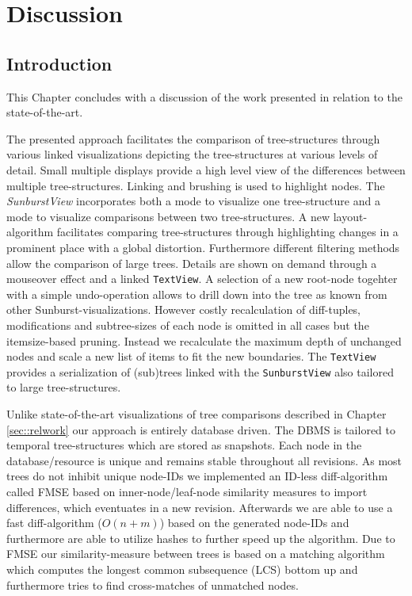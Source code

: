 \section{Discussion}\label{sec::discussion}
\subsection{Introduction}
This Chapter concludes with a discussion of the work presented in relation to the state-of-the-art.

The presented approach facilitates the comparison of tree-structures through various linked visualizations depicting the tree-structures at various levels of detail. Small multiple displays provide a high level view of the differences between multiple tree-structures. Linking and brushing is used to highlight nodes. The \emph{SunburstView} incorporates both a mode to visualize one tree-structure and a mode to visualize comparisons between two tree-structures. A new layout-algorithm facilitates comparing tree-structures through highlighting changes in a prominent place with a global distortion. Furthermore different filtering methods allow the comparison of large trees. Details are shown on demand through a mouseover effect and a linked \texttt{TextView}. A selection of a new root-node togehter with a simple undo-operation allows to drill down into the tree as known from other Sunburst-visualizations. However costly recalculation of diff-tuples, modifications and subtree-sizes of each node is omitted in all cases but the itemsize-based pruning. Instead we recalculate the maximum depth of unchanged nodes and scale a new list of items to fit the new boundaries. The \texttt{TextView} provides a serialization of (sub)trees linked with the \texttt{SunburstView} also tailored to large tree-structures.

Unlike state-of-the-art visualizations of tree comparisons described in Chapter \ref{sec::relwork} our approach is entirely database driven. The DBMS is tailored to temporal tree-structures which are stored as snapshots. Each node in the database/resource is unique and remains stable throughout all revisions. As most trees do not inhibit unique node-IDs we implemented an ID-less diff-algorithm called FMSE based on inner-node/leaf-node similarity measures to import differences, which eventuates in a new revision. Afterwards we are able to use a fast diff-algorithm ($O(n+m)$) based on the generated node-IDs and furthermore are able to utilize hashes to further speed up the algorithm. Due to FMSE our similarity-measure between trees is based on a matching algorithm which computes the longest common subsequence (LCS) bottom up and furthermore tries to find cross-matches of unmatched nodes.

